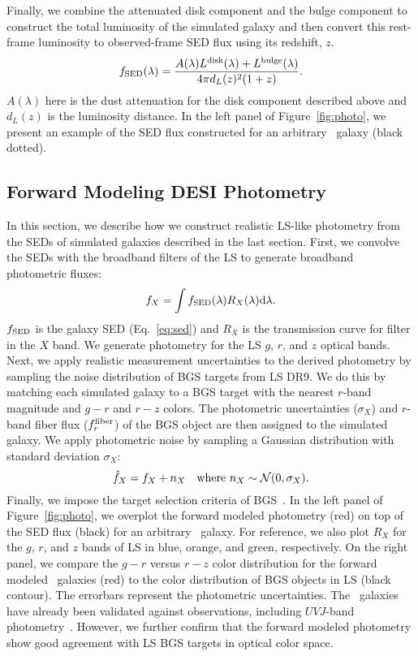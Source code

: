 Finally, we combine the attenuated disk component and the bulge component to
construct the total luminosity of the simulated galaxy and then convert this
rest-frame luminosity to observed-frame SED flux using its redshift, $z$.
\begin{equation}\label{eq:sed} 
    f_{\rm SED}(\lambda) = \frac{A(\lambda)L^{\rm disk}(\lambda) + L^{\rm bulge}(\lambda)}{4 \pi d_L(z)^2 (1+z)}.
\end{equation}
$A(\lambda)$ here is the dust attenuation for the disk component described
above and $d_L(z)$ is the luminosity distance.
In the left panel of Figure~\ref{fig:photo}, we present an example of the SED
flux constructed for an arbitrary \lgal~galaxy (black dotted).

\subsection{Forward Modeling DESI Photometry} \label{sec:photo} 
In this section, we describe how we construct realistic LS-like photometry
from the SEDs of simulated galaxies described in the last section.
First, we convolve the SEDs with the broadband filters of the LS to generate
broadband photometric fluxes: 
\begin{equation} \label{eq:photo}
    f_X = \int f_{\rm SED}(\lambda) R_X(\lambda) {\rm d}\lambda.
\end{equation}
$f_{\rm SED}$ is the galaxy SED (Eq.~\ref{eq:sed}) and $R_X$ is the
transmission curve for filter in the $X$ band. 
We generate photometry for the LS $g$, $r$, and $z$ optical bands.
Next, we apply realistic measurement uncertainties to the derived photometry by
sampling the noise distribution of BGS targets from LS DR9. 
We do this by matching each simulated galaxy to a BGS target with the nearest 
$r$-band magnitude and $g-r$ and $r-z$ colors.
The photometric uncertainties ($\sigma_X$) and $r$-band fiber flux ($f_r^{\rm
fiber}$) of the BGS object are then assigned to the simulated galaxy. 
We apply photometric noise by sampling a Gaussian distribution with standard
deviation $\sigma_X$: 
\begin{equation}
    \hat{f}_X = f_X + n_X  \quad {\rm where}~n_X \sim \mathcal{N}(0, \sigma_X).
\end{equation} 
Finally, we impose the target selection criteria of BGS~\citep[][Hahn~\etal~in
prep.]{ruiz-macias2021}.
In the left panel of Figure~\ref{fig:photo}, we overplot the forward
modeled photometry (red) on top of the SED flux (black) for an arbitrary
\lgal~galaxy. 
For reference, we also plot $R_X$ for the $g$, $r$, and $z$ bands of LS in
blue, orange, and green, respectively. 
On the right panel, we compare the $g - r$ versus $r - z$ color distribution
for the forward modeled \lgal~galaxies (red) to the color distribution of BGS
objects in LS (black contour). 
The errorbars represent the photometric uncertainties. 
The \lgal~galaxies have already been validated against observations, including
$UVJ$-band photometry~\cite{henriques2015}. 
However, we further confirm that the forward modeled photometry show good
agreement with LS BGS targets in optical color space.

